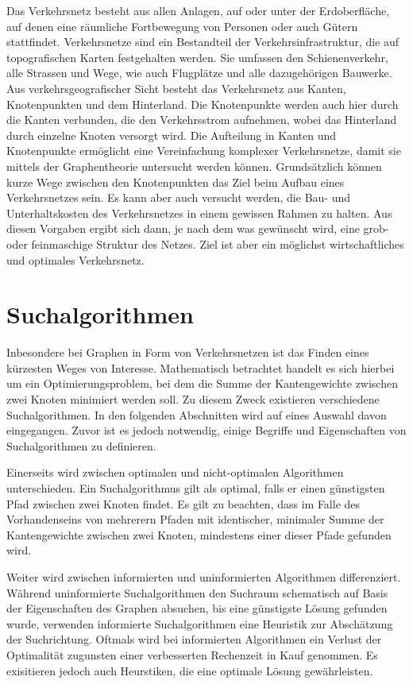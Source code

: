 \label{section:verkehr/einfuehrung}

Das Verkehrsnetz besteht aus allen Anlagen, auf oder unter der Erdoberfläche, auf denen eine räumliche Fortbewegung von Personen oder auch Gütern stattfindet. Verkehrsnetze sind ein Bestandteil der Verkehrsinfrastruktur, die auf topografischen Karten festgehalten werden. Sie umfassen den Schienenverkehr, alle Strassen und Wege, wie auch Flugplätze und alle dazugehörigen Bauwerke.
Aus verkehrsgeografischer Sicht besteht das Verkehrsnetz aus Kanten, Knotenpunkten und dem Hinterland. Die Knotenpunkte werden auch hier durch die Kanten verbunden, die den Verkehrsstrom aufnehmen, wobei das Hinterland durch einzelne Knoten versorgt wird. Die Aufteilung in Kanten und Knotenpunkte ermöglicht eine Vereinfachung komplexer Verkehrsnetze, damit sie mittels der Graphentheorie untersucht werden können.
Grundsätzlich können kurze Wege zwischen den Knotenpunkten das Ziel beim Aufbau eines Verkehrsnetzes sein. Es kann aber auch versucht werden, die Bau- und Unterhaltskosten des Verkehrsnetzes in einem gewissen Rahmen zu halten. Aus diesen Vorgaben ergibt sich dann, je nach dem was gewünscht wird, eine grob- oder feinmaschige Struktur des Netzes.
Ziel ist aber ein möglichst wirtschaftliches und optimales Verkehrsnetz.

\section{Suchalgorithmen}
Inbesondere bei Graphen in Form von Verkehrsnetzen ist das Finden eines kürzesten Weges von Interesse. Mathematisch betrachtet handelt es sich hierbei um ein Optimierungsproblem, bei dem die Summe der Kantengewichte zwischen zwei Knoten minimiert werden soll. Zu diesem Zweck existieren verschiedene Suchalgorithmen. In den folgenden Abschnitten wird auf eines Auswahl davon eingegangen. Zuvor ist es jedoch notwendig, einige Begriffe und Eigenschaften von Suchalgorithmen zu definieren.

Einerseits wird zwischen optimalen und nicht-optimalen Algorithmen unterschieden. Ein Suchalgorithmus gilt als optimal, falls er einen günstigsten Pfad zwischen zwei Knoten findet. Es gilt zu beachten, dass im Falle des Vorhandenseins von mehrerern Pfaden mit identischer, minimaler Summe der Kantengewichte zwischen zwei Knoten, mindestens einer dieser Pfade gefunden wird.

Weiter wird zwischen informierten und uninformierten Algorithmen differenziert. Während uninformierte Suchalgorithmen den Suchraum schematisch auf Basis der Eigenschaften des Graphen absuchen, bis eine günstigste Lösung gefunden wurde, verwenden informierte Suchalgorithmen eine Heuristik zur Abschätzung der Suchrichtung. Oftmals wird bei informierten Algorithmen ein Verlust der Optimalität zugunsten einer verbesserten Rechenzeit in Kauf genommen. Es exisitieren jedoch auch Heurstiken, die eine optimale Lösung gewährleisten.

